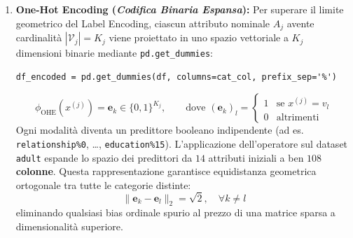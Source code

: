 \begin{enumerate}
    \begin{alertblock}{Patologia di Ordinamento Indotta dal Label Encoding}
    L'assegnazione di numeri interi arbitrari a variabili nominali non ordinate (prive di graduazione naturale) induce una relazione d'ordine artificiale e metriche di distanza prive di significato semantico:
    \begin{align*}
        |2 - 0| &< |4 - 0| \implies \\
        d(\text{`Married'}, \text{`Divorced'}) &< d(\text{`Never-married'}, \text{`Divorced'})
    \end{align*}
    Mentre gli \textbf{alberi di decisione} possono tollerare tale codifica (poiché valutano predicati di disuguaglianza univariata su singoli valori discreti preservando le partizioni locali), gli algoritmi basati su funzioni di distanza vettoriale euclidea o di Minkowski (quali $k$-\textit{Nearest Neighbors}, Support Vector Machines a kernel RBF e Reti Neurali) interpretano tali interi come coordinate metriche, distorcendo gravemente la topologia dello spazio delle feature.
    \end{alertblock}

    \item \textbf{One-Hot Encoding (\textit{Codifica Binaria Espansa}):}
    Per superare il limite geometrico del Label Encoding, ciascun attributo nominale $A_j$ avente cardinalità $|\mathcal{V}_j| = K_j$ viene proiettato in uno spazio vettoriale a $K_j$ dimensioni binarie mediante \texttt{pd.get\_dummies}:
    \begin{lstlisting}[style=pythoncode, caption={Espansione binaria delle variabili categoriche tramite One-Hot Encoding.}]
df_encoded = pd.get_dummies(df, columns=cat_col, prefix_sep='%')
    \end{lstlisting}
    \begin{equation}
        \phi_{\text{OHE}}(x^{(j)}) = \mathbf{e}_k \in \{0, 1\}^{K_j}, \qquad \text{dove } (\mathbf{e}_k)_l = \begin{cases} 1 & \text{se } x^{(j)} = v_l \\ 0 & \text{altrimenti} \end{cases}
    \end{equation}
    Ogni modalità diventa un predittore booleano indipendente (ad es. \texttt{relationship\%0}, \dots, \texttt{education\%15}). L'applicazione dell'operatore sul dataset \texttt{adult} espande lo spazio dei predittori da $14$ attributi iniziali a ben \textbf{$108$ colonne}. Questa rappresentazione garantisce equidistanza geometrica ortogonale tra tutte le categorie distinte:
    \begin{equation}
        \|\mathbf{e}_k - \mathbf{e}_l\|_2 = \sqrt{2}, \quad \forall k \neq l
    \end{equation}
    eliminando qualsiasi bias ordinale spurio al prezzo di una matrice sparsa a dimensionalità superiore.
\end{enumerate}

